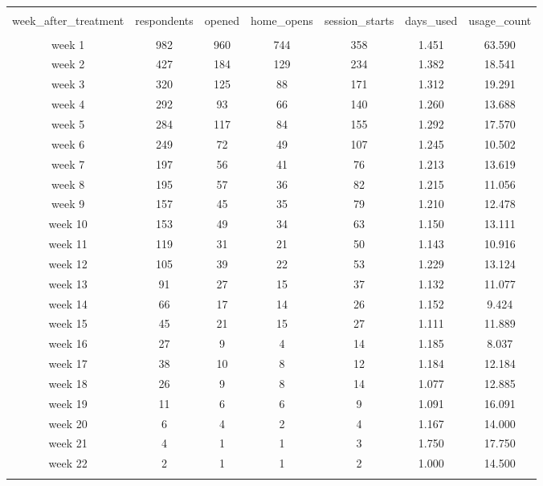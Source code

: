 
\begin{table}[!htbp] \centering 
  \caption{} 
  \label{tbl:weekly_aggregates} 
\begin{tabular}{@{\extracolsep{5pt}} ccccccc} 
\\[-1.8ex]\hline 
\hline \\[-1.8ex] 
week\_after\_treatment & respondents & opened & home\_opens & session\_starts & days\_used & usage\_count \\ 
\hline \\[-1.8ex] 
week 1 & 982 & 960 & 744 & 358 & 1.451 & 63.590 \\ 
week 2 & 427 & 184 & 129 & 234 & 1.382 & 18.541 \\ 
week 3 & 320 & 125 &  88 & 171 & 1.312 & 19.291 \\ 
week 4 & 292 &  93 &  66 & 140 & 1.260 & 13.688 \\ 
week 5 & 284 & 117 &  84 & 155 & 1.292 & 17.570 \\ 
week 6 & 249 &  72 &  49 & 107 & 1.245 & 10.502 \\ 
week 7 & 197 &  56 &  41 &  76 & 1.213 & 13.619 \\ 
week 8 & 195 &  57 &  36 &  82 & 1.215 & 11.056 \\ 
week 9 & 157 &  45 &  35 &  79 & 1.210 & 12.478 \\ 
week 10 & 153 &  49 &  34 &  63 & 1.150 & 13.111 \\ 
week 11 & 119 &  31 &  21 &  50 & 1.143 & 10.916 \\ 
week 12 & 105 &  39 &  22 &  53 & 1.229 & 13.124 \\ 
week 13 &  91 &  27 &  15 &  37 & 1.132 & 11.077 \\ 
week 14 &  66 &  17 &  14 &  26 & 1.152 &  9.424 \\ 
week 15 &  45 &  21 &  15 &  27 & 1.111 & 11.889 \\ 
week 16 &  27 &   9 &   4 &  14 & 1.185 &  8.037 \\ 
week 17 &  38 &  10 &   8 &  12 & 1.184 & 12.184 \\ 
week 18 &  26 &   9 &   8 &  14 & 1.077 & 12.885 \\ 
week 19 &  11 &   6 &   6 &   9 & 1.091 & 16.091 \\ 
week 20 &   6 &   4 &   2 &   4 & 1.167 & 14.000 \\ 
week 21 &   4 &   1 &   1 &   3 & 1.750 & 17.750 \\ 
week 22 &   2 &   1 &   1 &   2 & 1.000 & 14.500 \\ 
\hline \\[-1.8ex] 
\end{tabular} 
\end{table} 
